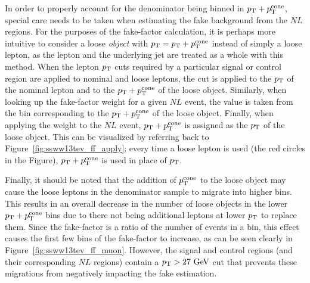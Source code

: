 In order to properly account for the denominator being binned in $p_{\mathrm{T}}+p_{\mathrm{T}}^{\textrm{cone}}$, special care needs to be taken when estimating the fake background from the $NL$ regions.
For the purposes of the fake-factor calculation, it is perhaps more intuitive to consider a loose \emph{object} with $p_{\mathrm{T}}=p_{\mathrm{T}}+p_{\mathrm{T}}^{\textrm{cone}}$ instead of simply a loose lepton, as the lepton and the underlying jet are treated as a whole with this method.
When the lepton $p_{\mathrm{T}}$ cuts required by a particular signal or control region are applied to nominal and loose leptons, the cut is applied to the $p_{\mathrm{T}}$ of the nominal lepton and to the $p_{\mathrm{T}}+p_{\mathrm{T}}^{\textrm{cone}}$ of the loose object.
Similarly, when looking up the fake-factor weight for a given $NL$ event, the value is taken from the bin corresponding to the $p_{\mathrm{T}}+p_{\mathrm{T}}^{\textrm{cone}}$ of the loose object.
Finally, when applying the weight to the $NL$ event, $p_{\mathrm{T}}+p_{\mathrm{T}}^{\textrm{cone}}$ is assigned as the $p_{\mathrm{T}}$ of the loose object.
This can be visualized by referring back to Figure~\ref{fig:ssww13tev_ff_apply}; every time a loose lepton is used (the red circles in the Figure), $p_{\mathrm{T}}+p_{\mathrm{T}}^{\textrm{cone}}$ is used in place of $p_{\mathrm{T}}$.


Finally, it should be noted that the addition of $p_{\mathrm{T}}^{\textrm{cone}}$ to the loose object may cause the loose leptons in the denominator sample to migrate into higher bins.
This results in an overall decrease in the number of loose objects in the lower $p_{\mathrm{T}}+p_{\mathrm{T}}^{\textrm{cone}}$ bins due to there not being additional leptons at lower $p_{\mathrm{T}}$ to replace them.
Since the fake-factor is a ratio of the number of events in a bin, this effect causes the first few bins of the fake-factor to increase, as can be seen clearly in Figure~\ref{fig:ssww13tev_ff_muon}.
However, the signal and control regions (and their corresponding $NL$ regions) contain a $\pt > 27\gev$ cut that prevents these migrations from negatively impacting the fake estimation.

